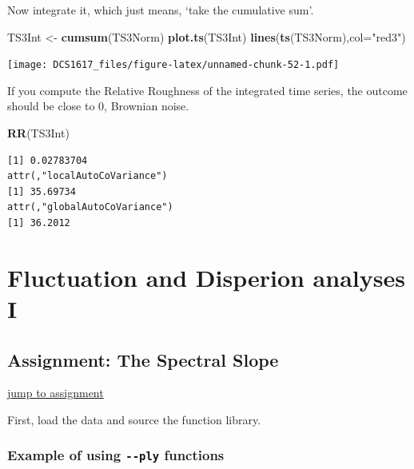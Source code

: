 \documentclass[]{book}
\newenvironment{Shaded}{\begin{snugshade}}{\end{snugshade}}
\newcommand{\KeywordTok}[1]{\textcolor[rgb]{0.13,0.29,0.53}{\textbf{{#1}}}}
\newcommand{\DataTypeTok}[1]{\textcolor[rgb]{0.13,0.29,0.53}{{#1}}}
\newcommand{\StringTok}[1]{\textcolor[rgb]{0.31,0.60,0.02}{{#1}}}
\newcommand{\NormalTok}[1]{{#1}}
\let\stdsection\section
\renewcommand\section{\newpage\stdsection}
\let\BeginKnitrBlock\begin \let\EndKnitrBlock\end
\begin{document}
Now integrate it, which just means, `take the cumulative sum'.

\begin{Shaded}
\begin{Highlighting}[]
\NormalTok{TS3Int <-}\StringTok{ }\KeywordTok{cumsum}\NormalTok{(TS3Norm)}
\KeywordTok{plot.ts}\NormalTok{(TS3Int)}
\KeywordTok{lines}\NormalTok{(}\KeywordTok{ts}\NormalTok{(TS3Norm),}\DataTypeTok{col=}\StringTok{"red3"}\NormalTok{)}
\end{Highlighting}
\end{Shaded}

\texttt{[image: DCS1617\_files/figure-latex/unnamed-chunk-52-1.pdf]}

If you compute the Relative Roughness of the integrated time series, the
outcome should be close to 0, Brownian noise.

\begin{Shaded}
\begin{Highlighting}[]
\KeywordTok{RR}\NormalTok{(TS3Int)}
\end{Highlighting}
\end{Shaded}

\begin{verbatim}
[1] 0.02783704
attr(,"localAutoCoVariance")
[1] 35.69734
attr(,"globalAutoCoVariance")
[1] 36.2012
\end{verbatim}

\chapter{\texorpdfstring{\textbf{Fluctuation and Disperion analyses
I}}{Fluctuation and Disperion analyses I}}\label{fda1sol}

\hypertarget{psdsol}{\section{Assignment: The Spectral
Slope}\label{psdsol}}

\protect\hyperlink{psd}{\textbar{} jump to assignment \textbar{}}

\BeginKnitrBlock{rmdimportant}
First, load the data and source the function library.
\EndKnitrBlock{rmdimportant}

\subsection{\texorpdfstring{Example of using \texttt{-\/-ply}
functions}{Example of using -\/-ply functions}}\label{example-of-using---ply-functions}
\end{document}
